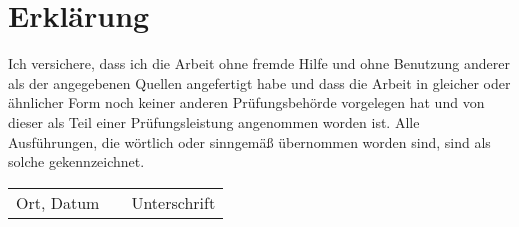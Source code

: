 \chapter*{Erklärung}
	\thispagestyle{empty}
	Ich versichere, dass ich die Arbeit ohne fremde Hilfe und ohne
	Benutzung anderer als der angegebenen Quellen angefertigt habe und dass
	die Arbeit in gleicher oder ähnlicher Form noch keiner anderen
	Prüfungsbehörde vorgelegen hat und von dieser als Teil einer
	Prüfungsleistung angenommen worden ist. Alle Ausführungen, die wörtlich
	oder sinngemäß übernommen worden sind, sind als solche
	gekennzeichnet.\\
	\vspace{27pt}

	\begin{center}
		\begin{tabular}{l p{} r}
			\cline{1-1} \cline{3-3}
			\begin{minipage}[t]{0.4\textwidth}
				\centering
				Ort, Datum
			\end{minipage}
			&&  
			\begin{minipage}[t]{0.4\textwidth}
				\centering
				Unterschrift
			\end{minipage}
	\end{tabular}
\end{center}

